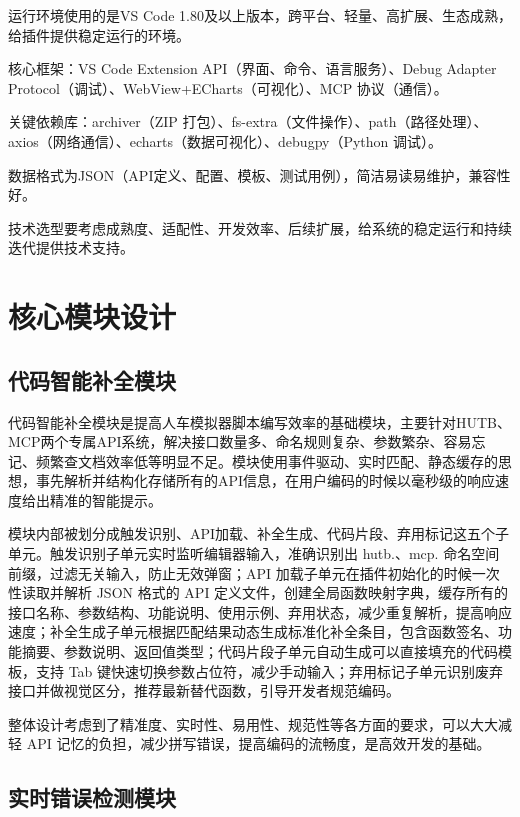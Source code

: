 运行环境使用的是VS Code
1.80及以上版本，跨平台、轻量、高扩展、生态成熟，给插件提供稳定运行的环境。

核心框架：VS Code Extension API（界面、命令、语言服务）、Debug Adapter
Protocol（调试）、WebView+ECharts（可视化）、MCP 协议（通信）。

关键依赖库：archiver（ZIP
打包）、fs-extra（文件操作）、path（路径处理）、axios（网络通信）、echarts（数据可视化）、debugpy（Python
调试）。

数据格式为JSON（API定义、配置、模板、测试用例），简洁易读易维护，兼容性好。

技术选型要考虑成熟度、适配性、开发效率、后续扩展，给系统的稳定运行和持续迭代提供技术支持。

\section{核心模块设计}

\subsection{代码智能补全模块}

代码智能补全模块是提高人车模拟器脚本编写效率的基础模块，主要针对HUTB、MCP两个专属API系统，解决接口数量多、命名规则复杂、参数繁杂、容易忘记、频繁查文档效率低等明显不足。模块使用事件驱动、实时匹配、静态缓存的思想，事先解析并结构化存储所有的API信息，在用户编码的时候以毫秒级的响应速度给出精准的智能提示。

模块内部被划分成触发识别、API加载、补全生成、代码片段、弃用标记这五个子单元。触发识别子单元实时监听编辑器输入，准确识别出
hutb.、mcp. 命名空间前缀，过滤无关输入，防止无效弹窗；API
加载子单元在插件初始化的时候一次性读取并解析 JSON 格式的 API
定义文件，创建全局函数映射字典，缓存所有的接口名称、参数结构、功能说明、使用示例、弃用状态，减少重复解析，提高响应速度；补全生成子单元根据匹配结果动态生成标准化补全条目，包含函数签名、功能摘要、参数说明、返回值类型；代码片段子单元自动生成可以直接填充的代码模板，支持
Tab
键快速切换参数占位符，减少手动输入；弃用标记子单元识别废弃接口并做视觉区分，推荐最新替代函数，引导开发者规范编码。

整体设计考虑到了精准度、实时性、易用性、规范性等各方面的要求，可以大大减轻
API 记忆的负担，减少拼写错误，提高编码的流畅度，是高效开发的基础。

\subsection{实时错误检测模块}

